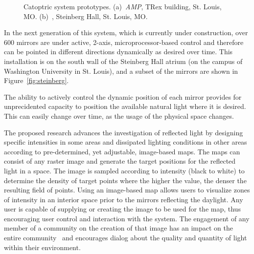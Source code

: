 \begin{figure}[ht]
\centering
{}
\qquad \qquad
{}
\caption{Catoptric system prototypes.
(a)~\emph{AMP}, TRex building, St. Louis, MO.
(b)~, Steinberg Hall, St. Louis, MO.
}
\label{fig:proto}
\end{figure}

In the next generation of this system, which is currently under construction,
over 600 mirrors are under active, 2-axis, microprocessor-based control and
therefore can be pointed in different directions dynamically as desired
over time. This installation is on the south wall of the Steinberg Hall
atrium (on
the campus of Washington University in St. Louis), and a subset of the
mirrors are shown in Figure~\ref{fig:steinberg}.

The ability to actively control the dynamic position of each mirror provides
for unprecidented capacity to position the available natural light where
it is desired.  This can easily change over time, as the usage of the
physical space changes.

The proposed research advances the investigation of reflected light by
designing specific intensities in some areas and dissipated lighting
conditions in other areas according to pre-determined, yet adjustable,
image-based maps. The maps can consist of any raster image and generate the
target positions for the reflected light in a space.  The image is sampled
according to intensity (black to white) to determine the density
of target points where the higher the value, the denser the resulting
field of points. Using an image-based map allows users to visualize
zones of intensity in an interior space prior to the mirrors reflecting
the daylight. Any user is capable of supplying or creating the image
to be used for the map, thus encouraging user control and interaction with
the system. The engagement of any member of a community on the creation
of that image has an impact on the entire community~\cite{BS13} and
encourages dialog about the quality and quantity of light within their
environment. 

